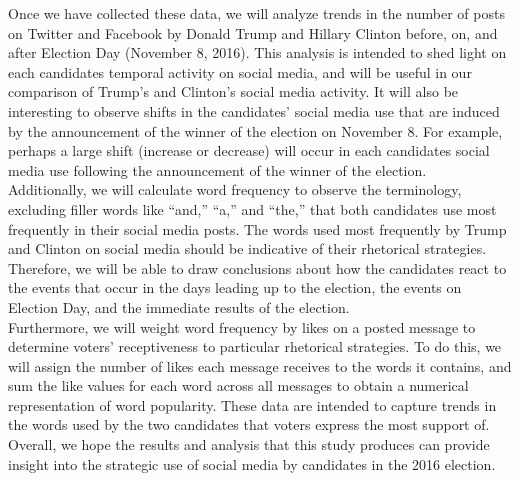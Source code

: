 \documentclass{article}
\begin{document}
\indent Once we have collected these data, we will analyze trends in the number of posts on Twitter and Facebook by Donald Trump and Hillary Clinton before, on, and after Election Day (November 8, 2016). This analysis is intended to shed light on each candidate\textquotesingle s temporal activity on social media, and will be useful in our comparison of Trump’s and Clinton’s social media activity. It will also be interesting to observe shifts in the candidates’ social media use that are induced by the announcement of the winner of the election on November 8. For example, perhaps a large shift (increase or decrease) will occur in each candidate\textquotesingle s social media use following the announcement of the winner of the election. \\
\indent Additionally, we will calculate word frequency to observe the terminology, excluding filler words like “and,” “a,” and “the,” that both candidates use most frequently in their social media posts. The words used most frequently by Trump and Clinton on social media should be indicative of their rhetorical strategies. Therefore, we will be able to draw conclusions about how the candidates react to the events that occur in the days leading up to the election, the events on Election Day, and the immediate results of the election.\\
\indent Furthermore, we will weight word frequency by likes on a posted message to determine voters’ receptiveness to particular rhetorical strategies. To do this, we will assign the number of likes each message receives to the words it contains, and sum the like values for each word across all messages to obtain a numerical representation of word popularity. These data are intended to capture trends in the words used by the two candidates that voters express the most support of.\\
\indent Overall, we hope the results and analysis that this study produces can provide insight into the strategic use of social media by candidates in the 2016 election.
\end{document}
